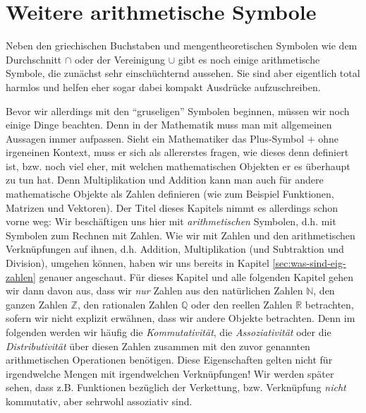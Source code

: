 \section{Weitere arithmetische Symbole}
Neben den griechischen Buchstaben und mengentheoretischen Symbolen wie dem Durchschnitt \(\cap\) oder der Vereinigung \(\cup\) gibt es noch einige arithmetische Symbole, die zunächst sehr einschüchternd aussehen. Sie sind aber eigentlich total harmlos und helfen eher sogar dabei kompakt Ausdrücke aufzuschreiben. 

Bevor wir allerdings mit den "`gruseligen"' Symbolen beginnen, müssen wir noch einige Dinge beachten. Denn in der Mathematik muss man mit allgemeinen Aussagen immer aufpassen. Sieht ein Mathematiker das Plus-Symbol \(+\) ohne irgeneinen Kontext, muss er sich als allererstes fragen, wie dieses denn definiert ist, bzw. noch viel eher, mit welchen mathematischen Objekten er es überhaupt zu tun hat. Denn Multiplikation und Addition kann man auch für andere mathematische Objekte als Zahlen definieren (wie zum Beispiel Funktionen, Matrizen und Vektoren). Der Titel dieses Kapitels nimmt es allerdings schon vorne weg: Wir beschäftigen uns hier mit \textit{arithmetischen} Symbolen, d.h. mit Symbolen zum Rechnen mit Zahlen. Wie wir mit Zahlen und den arithmetischen Verknüpfungen auf ihnen, d.h. Addition, Multiplikation (und Subtraktion und Division), umgehen können, haben wir uns bereits in Kapitel \ref{sec:was-sind-eig-zahlen} genauer angeschaut. Für dieses Kapitel und alle folgenden Kapitel gehen wir dann davon aus, dass wir \textit{nur} Zahlen aus den natürlichen Zahlen \(\mathbb N\), den ganzen Zahlen \(\mathbb Z\), den rationalen Zahlen \(\mathbb Q\) oder den reellen Zahlen \(\mathbb R\) betrachten, sofern wir nicht explizit erwähnen, dass wir andere Objekte betrachten. Denn im folgenden werden wir häufig die \textit{Kommutativität}, die \textit{Assoziativität} oder die \textit{Distributivität} über diesen Zahlen zusammen mit den zuvor genannten arithmetischen Operationen benötigen. Diese Eigenschaften gelten nicht für irgendwelche Mengen mit irgendwelchen Verknüpfungen! Wir werden später sehen, dass z.B. Funktionen bezüglich der Verkettung, bzw. Verknüpfung \textit{nicht} kommutativ, aber sehrwohl assoziativ sind. 

